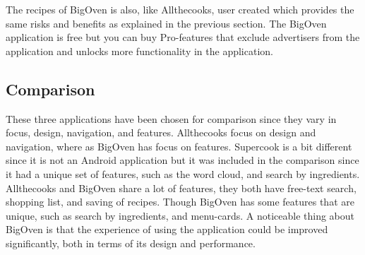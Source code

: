 The recipes of BigOven is also, like Allthecooks, user created which provides the same risks and benefits as explained in the previous section.
The BigOven application is free but you can buy Pro-features that exclude advertisers from the application and unlocks more functionality in the application.

\subsection{Comparison}
These three applications have been chosen for comparison since they vary in focus, design, navigation, and features. Allthecooks focus on design and navigation, where as BigOven has focus on features. Supercook is a bit different since it is not an Android application but it was included in the comparison since it had a unique set of features, such as the word cloud, and search by ingredients.
Allthecooks and BigOven share a lot of features, they both have free-text search, shopping list, and saving of recipes. Though BigOven has some features that are unique, such as search by ingredients, and menu-cards. A noticeable thing about BigOven is that the experience of using the application could be improved significantly, both in terms of its design and performance.

